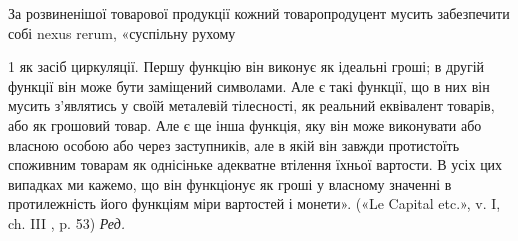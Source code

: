 За розвиненішої товарової продукції кожний товаропродуцент
мусить забезпечити собі nexus rerum, «суспільну рухому

1 як засіб циркуляції. Першу функцію він виконує як ідеальні гроші;
в другій функції він може бути заміщений символами. Але є такі функції,
що в них він мусить з’являтись у своїй металевій тілесності, як реальний
еквівалент товарів, або як грошовий товар. Але є ще інша функція, яку він
може виконувати або власною особою або через заступників, але в якій
він завжди протистоїть споживним товарам як однісіньке адекватне
втілення їхньої вартости. В усіх цих випадках ми кажемо, що він функціонує
як гроші у власному значенні в протилежність його функціям міри
вартостей і монети». («Le Capital etc.», v. I, ch. III , p. 53) \emph{Ред.}
\parbreak{}  %
